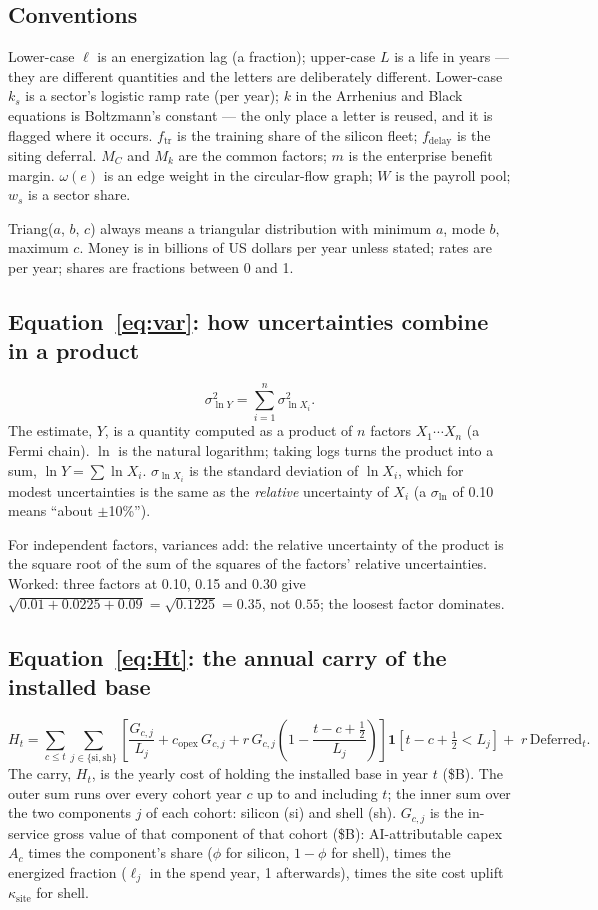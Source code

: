 \documentclass[11pt,letterpaper]{article}
\begin{document}
\subsection*{Conventions}
Lower-case $\ell$ is an energization lag (a fraction); upper-case $L$ is a life in years --- they are different quantities and the letters are deliberately different. Lower-case $k_s$ is a sector's logistic ramp rate (per year); $k$ in the Arrhenius and Black equations is Boltzmann's constant --- the only place a letter is reused, and it is flagged where it occurs. $f_{\text{tr}}$ is the training share of the silicon fleet; $f_{\text{delay}}$ is the siting deferral. $M_C$ and $M_k$ are the common factors; $m$ is the enterprise benefit margin. $\omega(e)$ is an edge weight in the circular-flow graph; $W$ is the payroll pool; $w_s$ is a sector share.

Triang($a$, $b$, $c$) always means a triangular distribution with minimum $a$, mode $b$, maximum $c$. Money is in billions of US dollars per year unless stated; rates are per year; shares are fractions between 0 and 1.

\subsection*{Equation~\ref{eq:var}: how uncertainties combine in a product}
\[\sigma^{2}_{\ln Y}=\sum_{i=1}^{n}\sigma^{2}_{\ln X_i}.\]
The estimate, $Y$, is a quantity computed as a product of $n$ factors $X_1\cdots X_n$ (a Fermi chain). $\ln$ is the natural logarithm; taking logs turns the product into a sum, $\ln Y=\sum\ln X_i$. $\sigma_{\ln X_i}$ is the standard deviation of $\ln X_i$, which for modest uncertainties is the same as the \emph{relative} uncertainty of $X_i$ (a $\sigma_{\ln}$ of 0.10 means ``about $\pm$10\%'').

For independent factors, variances add: the relative uncertainty of the product is the square root of the sum of the squares of the factors' relative uncertainties. Worked: three factors at 0.10, 0.15 and 0.30 give $\sqrt{0.01+0.0225+0.09}=\sqrt{0.1225}=0.35$, not $0.55$; the loosest factor dominates.

\subsection*{Equation~\ref{eq:Ht}: the annual carry of the installed base}
\[H_t=\sum_{c\le t}\sum_{j\in\{\text{si},\text{sh}\}}\left[\frac{G_{c,j}}{L_j}+c_{\text{opex}}\,G_{c,j}+r\,G_{c,j}\!\left(1-\frac{t-c+\tfrac12}{L_j}\right)\right]\mathbf{1}\!\left[t-c+\tfrac12<L_j\right]+\;r\,\text{Deferred}_t.\]
The carry, $H_t$, is the yearly cost of holding the installed base in year $t$ (\$B). The outer sum runs over every cohort year $c$ up to and including $t$; the inner sum over the two components $j$ of each cohort: silicon (si) and shell (sh). $G_{c,j}$ is the in-service gross value of that component of that cohort (\$B): AI-attributable capex $A_c$ times the component's share ($\phi$ for silicon, $1-\phi$ for shell), times the energized fraction ($\ell_j$ in the spend year, 1 afterwards), times the site cost uplift $\kappa_{\text{site}}$ for shell.
\end{document}
